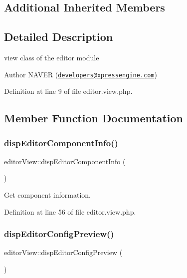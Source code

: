 \subsection*{Additional Inherited Members}


\subsection{Detailed Description}
view class of the editor module 

\begin{DoxyAuthor}{Author}
N\+A\+V\+ER (\href{mailto:developers@xpressengine.com}{\tt developers@xpressengine.\+com}) 
\end{DoxyAuthor}


Definition at line 9 of file editor.\+view.\+php.



\subsection{Member Function Documentation}
\mbox{\label{classeditorView_ab303eb3a43e6099484f3c7a090ef3a91}} 
\subsubsection{\texorpdfstring{disp\+Editor\+Component\+Info()}{dispEditorComponentInfo()}}
{\footnotesize\ttfamily editor\+View\+::disp\+Editor\+Component\+Info (\begin{DoxyParamCaption}{ }\end{DoxyParamCaption})}



Get component information. 



Definition at line 56 of file editor.\+view.\+php.

\mbox{\label{classeditorView_aeaef8bfc0e3897c7dadbc8cffc1e4bd5}} 
\subsubsection{\texorpdfstring{disp\+Editor\+Config\+Preview()}{dispEditorConfigPreview()}}
{\footnotesize\ttfamily editor\+View\+::disp\+Editor\+Config\+Preview (\begin{DoxyParamCaption}{ }\end{DoxyParamCaption})}



